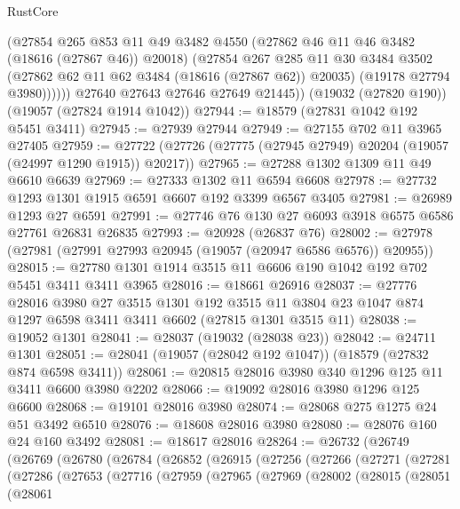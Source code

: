 \begin{lexlean}{RustCore}
\begin{coremodule}
              (@27854
                @265
                @853
                @11
                @49
                @3482
                @4550
                (@27862 @46 @11 @46 @3482 (@18616 (@27867 @46)) @20018)
                (@27854
                  @267
                  @285
                  @11
                  @30
                  @3484
                  @3502
                  (@27862 @62 @11 @62 @3484 (@18616 (@27867 @62)) @20035)
                  (@19178 @27794 @3980))))))
        @27640
        @27643
        @27646
        @27649
        @21445))
    (@19032 (@27820 @190))
    (@19057 (@27824 @1914 @1042))
@27944 := @18579 (@27831 @1042 @192 @5451 @3411)
@27945 := @27939 @27944
@27949 := @27155 @702 @11 @3965 @27405
@27959 := @27722 (@27726 (@27775 (@27945 @27949) @20204 (@19057 (@24997 @1290 @1915)) @20217))
@27965 := @27288 @1302 @1309 @11 @49 @6610 @6639
@27969 := @27333 @1302 @11 @6594 @6608
@27978 := @27732 @1293 @1301 @1915 @6591 @6607 @192 @3399 @6567 @3405
@27981 := @26989 @1293 @27 @6591
@27991 := @27746 @76 @130 @27 @6093 @3918 @6575 @6586 @27761 @26831 @26835
@27993 := @20928 (@26837 @76)
@28002 := @27978 (@27981 (@27991 @27993 @20945 (@19057 (@20947 @6586 @6576)) @20955))
@28015 := @27780 @1301 @1914 @3515 @11 @6606 @190 @1042 @192 @702 @5451 @3411 @3411 @3965
@28016 := @18661 @26916
@28037 := @27776
    @28016
    @3980
    @27
    @3515
    @1301
    @192
    @3515
    @11
    @3804
    @23
    @1047
    @874
    @1297
    @6598
    @3411
    @3411
    @6602
    (@27815 @1301 @3515 @11)
@28038 := @19052 @1301
@28041 := @28037 (@19032 (@28038 @23))
@28042 := @24711 @1301
@28051 := @28041 (@19057 (@28042 @192 @1047)) (@18579 (@27832 @874 @6598 @3411))
@28061 := @20815 @28016 @3980 @340 @1296 @125 @11 @3411 @6600 @3980 @2202
@28066 := @19092 @28016 @3980 @1296 @125 @6600
@28068 := @19101 @28016 @3980
@28074 := @28068 @275 @1275 @24 @51 @3492 @6510
@28076 := @18608 @28016 @3980
@28080 := @28076 @160 @24 @160 @3492
@28081 := @18617 @28016
@28264 := @26732
    (@26749
      (@26769
        (@26780
          (@26784
            (@26852
              (@26915
                (@27256
                  (@27266
                    (@27271
                      (@27281
                        (@27286
                          (@27653
                            (@27716
                              (@27959
                                (@27965
                                  (@27969
                                    (@28002
                                      (@28015
                                        (@28051
                                          (@28061

\end{coremodule}
\end{lexlean}
